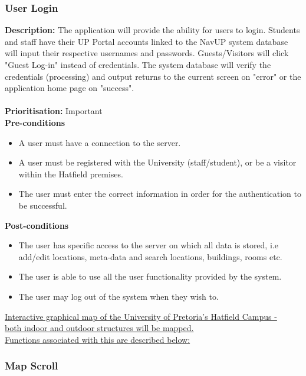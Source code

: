 \documentclass[runningheads,a4paper]{article}
\begin{document}
\subsubsection{User Login}
\textbf{Description:}  The application will provide the ability for users to login. Students and staff have their UP Portal accounts linked to the NavUP system database will input their respective usernames and passwords. Guests/Visitors will click "Guest Log-in" instead of credentials. The system database will verify the credentials (processing) and output returns to the current screen on "error" or the application home page on "success".\\\\
\noindent
\textbf{Prioritisation:} Important\\
  
  
\textbf{Pre-conditions}
\begin{itemize}
 	\item A user must have a connection to the server.
  	\item A user must be registered with the University (staff/student), or be a visitor within the Hatfield premises.
  	\item The user must enter the correct information in order for the authentication to be successful.
\end{itemize}
  
\textbf{Post-conditions}
\begin{itemize}
  	\item The user has specific access to the server on which all data is stored, i.e add/edit locations, meta-data and search locations, buildings, rooms etc.
  	\item The user is able to use all the user functionality provided by the system. 
  	\item The user may log out of the system when they wish to.
\end{itemize}

\noindent \underline{Interactive graphical map of the University of Pretoria's Hatfield Campus - }\\
\noindent \underline{both indoor and outdoor structures will be mapped.}\\
\noindent \underline{Functions associated with this are described below:}

\subsubsection{Map Scroll}
\end{document}
